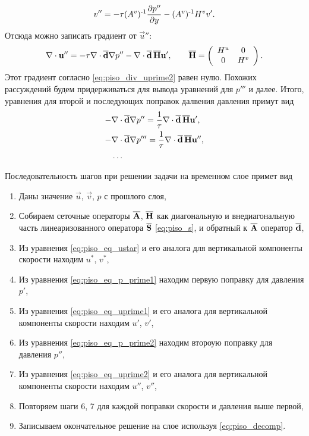 \begin{equation*}
v'' = -\tau (A^v)^{\text{-} 1}\frac{\partial p''}{\partial y} - (A^v)^{\text{-} 1} H^v v'.
\end{equation*}
Отсюда можно записать градиент от $\vec u''$:
\begin{equation*}
\nabla \cdot \boldsymbol{\rm u}'' = -\tau \nabla \cdot \boldsymbol{\overline{\rm d}} \nabla p'' - \nabla \cdot \boldsymbol{\overline{\rm d}} \, \boldsymbol{\overline{\rm H}} \boldsymbol{\rm u}',
\qquad
\boldsymbol{\overline{\rm H}} = \left(\begin{array}{cc}
H^u & 0 \\
0   & H^v
\end{array}
\right).
\end{equation*}
Этот градиент согласно \cref{eq:piso_div_uprime2} равен нулю.
Похожих рассуждений будем придерживаться для вывода уравнений для $p'''$ и далее.
Итого, уравнения для второй и последующих поправок далвения давления примут вид
\begin{align}
\label{eq:piso_eq_p_prime2}
 - &\nabla \cdot \boldsymbol{\overline{\rm d}} \nabla p'' = \frac1\tau \nabla \cdot \boldsymbol{\overline{\rm d}} \, \boldsymbol{\overline{\rm H}} \boldsymbol{\rm u}', \\
 - &\nabla \cdot \boldsymbol{\overline{\rm d}} \nabla p''' = \frac1\tau \nabla \cdot \boldsymbol{\overline{\rm d}} \, \boldsymbol{\overline{\rm H}} \boldsymbol{\rm u}'', \nonumber\\
   &\dots \nonumber
\end{align}

Последовательность шагов при решении задачи на временном слое примет вид
\begin{enumerate}
\item Даны значение $\vec u$, $\vec v$, $p$ с прошлого слоя,
\item Собираем сеточные операторы $\boldsymbol{\overline{\rm A}}$, $\boldsymbol{\overline{\rm H}}$ как диагональную и внедиагональную часть
      линеаризованного оператора $\boldsymbol{\overline{\rm S}}$ \cref{eq:piso_s}, и обратный к $\boldsymbol{\overline{\rm A}}$ оператор $\boldsymbol{\overline{\rm d}}$,
\item Из уравнения \cref{eq:piso_eq_ustar} и его аналога для вертикальной компоненты скорости находим $u^*$, $v^*$,
\item Из уравнения \cref{eq:piso_eq_p_prime1} находим первую поправку для давления $p'$,
\item Из уравнения \cref{eq:piso_eq_uprime1}  и его аналога для вертикальной компоненты скорости находим $u'$, $v'$,
\item Из уравнения \cref{eq:piso_eq_p_prime2} находим второую поправку для давления $p''$,
\item Из уравнения \cref{eq:piso_eq_uprime2}  и его аналога для вертикальной компоненты скорости находим $u''$, $v''$,
\item Повторяем шаги 6, 7 для каждой поправки скорости и давления выше первой,
\item Записываем окончательное решение  на слое используя \cref{eq:piso_decomp}.
\end{enumerate}

